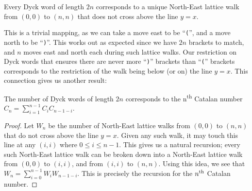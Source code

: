 \begin{theorem}
    Every Dyck word of length $2n$ corresponds to a unique North-East lattice walk from $(0, 0)$ to $(n, n)$ that does not cross above the line $y = x$. 
\end{theorem}

\noindent This is a trivial mapping, as we can take a move east to be ``\texttt{(}'', and a move north to be ``\texttt{)}''. This works out as expected since we have $2n$ brackets to match, and $n$ moves east and north each during such lattice walks. Our restriction on Dyck words that ensures there are never more ``\texttt{)}'' brackets than ``\texttt{(}'' brackets corresponds to the restriction of the walk being below (or on) the line $y = x$. This connection gives us another result:

\begin{theorem}
    The number of Dyck words of length $2n$ corresponds to the n\textsuperscript{th} Catalan number $C_{n}=\sum_{i=1}^{n-1}C_{i}C_{n-1-i}$.
\end{theorem}
\begin{proof}
    Let $W_{n}$ be the number of North-East lattice walks from $(0,0)$ to $(n,n)$ that do not cross above the line $y = x$. Given any such walk, it may touch this line at any $(i, i)$ where $0 \leq i \leq n-1$. This gives us a natural recursion; every such North-East lattice walk can be broken down into a North-East lattice walk from $(0, 0)$ to $(i, i)$, and from $(i, i)$ to $(n, n)$. Using this idea, we see that $W_{n}=\sum_{i=0}^{n-1}W_{i}W_{n-1-i}$. This is precisely the recursion for the $n\textsuperscript{th}$ Catalan number.
\end{proof}


